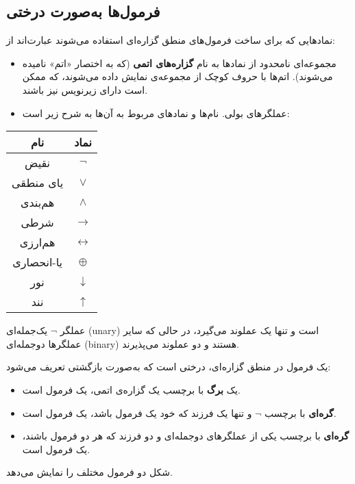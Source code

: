\subsection*{ فرمول‌ها به‌صورت درختی}
  \begin{definition}[تعریف \lr{2.1}]
    نمادهایی که برای ساخت فرمول‌های منطق گزاره‌ای استفاده می‌شوند عبارت‌اند از:
    \begin{itemize}
      \item مجموعه‌ای نامحدود از نمادها  به نام \textbf{گزاره‌های اتمی} (که به اختصار «اتم» نامیده می‌شوند). اتم‌ها با حروف کوچک از مجموعه‌ی  نمایش داده می‌شوند، که ممکن است دارای زیرنویس نیز باشند.
      \item عملگرهای بولی. نام‌ها و نمادهای مربوط به آن‌ها به شرح زیر است:
    \end{itemize}
  
    \begin{center}
      \begin{tabular}{|c|c|}
      \hline
        نام & نماد \\
        \hline
        نقیض & $\neg$ \\
        یای منطقی & $\lor$ \\
        هم‌بندی & $\land$ \\
        شرطی & $\rightarrow$ \\
        هم‌ارزی & $\leftrightarrow$ \\
        یا-انحصاری & $\oplus$ \\
        نور & $\downarrow$ \\
        نند & $\uparrow$ \\
      \hline
      \end{tabular}
    \end{center}
  
    عملگر $\neg$ یک‌جمله‌ای (unary) است و تنها یک عملوند می‌گیرد، در حالی که سایر عملگرها دوجمله‌ای (binary) هستند و دو عملوند می‌پذیرند.
  \end{definition}
  \begin{definition}[تعریف \lr{2.2}]
  یک فرمول در منطق گزاره‌ای، درختی است که به‌صورت بازگشتی تعریف می‌شود:
    \begin{itemize}
      \item یک \textbf{برگ} با برچسب یک گزاره‌ی اتمی، یک فرمول است.
      \item \textbf{گره‌ای} با برچسب $\neg$ و تنها یک فرزند که خود یک فرمول باشد، یک فرمول است.
      \item \textbf{گره‌ای} با برچسب یکی از عملگرهای دوجمله‌ای و دو فرزند که هر دو فرمول باشند، یک فرمول است.
    \end{itemize}
  \end{definition}
  \begin{example}[مثال \lr{2.3}]
    شکل  دو فرمول مختلف را نمایش می‌دهد.
  \end{example}